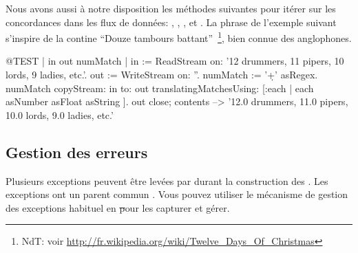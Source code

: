 \documentclass[a4paper,10pt,twoside]{book}
\begin{document}
Nous avons aussi à notre disposition les méthodes suivantes pour
itérer sur les concordances dans les flux de données:
,
,
,
 et
.
La phrase de l'exemple suivant s'inspire de la contine
``Douze tambours battant''~\footnote{NdT: voir \url{http://fr.wikipedia.org/wiki/Twelve_Days_Of_Christmas}}, bien connue des anglophones.

\begin{code}{@TEST | in out numMatch |}
in := ReadStream on: '12 drummers, 11 pipers, 10 lords, 9 ladies, etc.'.
out := WriteStream on: ''.
numMatch := '\<\d+\>' asRegex.
numMatch
  copyStream: in
  to: out
  translatingMatchesUsing: [:each | each asNumber asFloat asString ].
out close; contents --> '12.0 drummers, 11.0 pipers, 10.0 lords, 9.0 ladies, etc.'
\end{code} %


\subsection{Gestion des erreurs}

Plusieurs exceptions peuvent être levées par  durant la
construction des \expregs. Les exceptions ont un parent commun
.
Vous pouvez utiliser le mécanisme de gestion des exceptions habituel
en \st pour les capturer et gérer.
\end{document}
